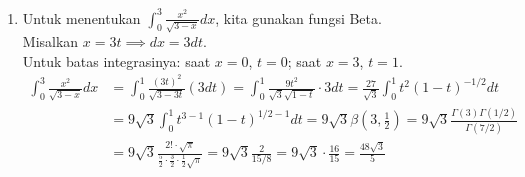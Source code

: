 \documentclass[11pt,letterpaper]{article}
\begin{document}
\begin{enumerate}
  \item Untuk menentukan $\int_{0}^{3} \frac{x^2}{\sqrt{3-x}} dx$, kita gunakan fungsi Beta. \\
        Misalkan $x = 3t \implies dx = 3 dt$. \\
        Untuk batas integrasinya: saat $x = 0$, $t = 0$; saat $x = 3$, $t = 1$.
        \begin{align*}
          \int_{0}^{3} \frac{x^2}{\sqrt{3-x}} dx & = \int_{0}^{1} \frac{(3t)^2}{\sqrt{3-3t}} (3 dt)                                                   = \int_{0}^{1} \frac{9t^2}{\sqrt{3}\sqrt{1-t}} \cdot 3 dt                                          = \frac{27}{\sqrt{3}} \int_{0}^{1} t^2 (1-t)^{-1/2} dt                                                                                                                                                                                                                                                                                                                                                                                                      \\
                                                 & = 9\sqrt{3} \int_{0}^{1} t^{3-1} (1-t)^{1/2-1} dt                                                                                                                                                                                                            = 9\sqrt{3} \beta\left(3, \frac{1}{2}\right)                                                                                                                                                                                                                 = 9\sqrt{3} \frac{\Gamma(3) \Gamma(1/2)}{\Gamma(7/2)}                                                                                   \\
                                                 & = 9\sqrt{3} \frac{2! \cdot \sqrt{\pi}}{\frac{5}{2} \cdot \frac{3}{2} \cdot \frac{1}{2} \sqrt{\pi}}                                                                                                                                                                                                                                                                                                                                                                                                                                                                              = 9\sqrt{3} \frac{2}{15/8} = 9\sqrt{3} \cdot \frac{16}{15} = \frac{48\sqrt{3}}{5}
        \end{align*}


\end{enumerate}
\end{document}
